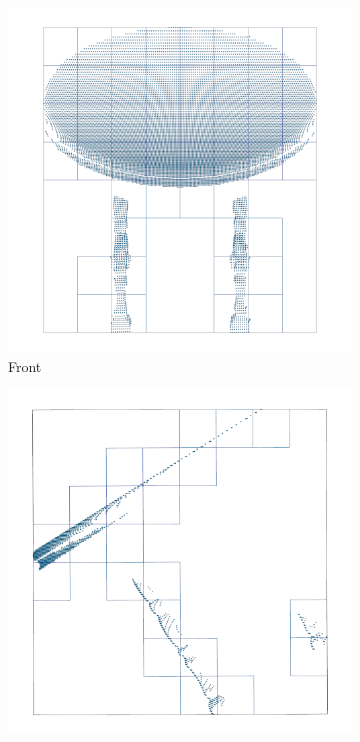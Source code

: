 \begin{figure}[!htb]
	\centering
	\hfill
	\begin{subfigure}{0.325\textwidth}
		\centering
		\includegraphics[width=\linewidth]{Figures/ObjRecog/surface_grid_front}
		\caption{Front}
		\label{subfig:objrecog:grid_occ:front}
	\end{subfigure}
	\hfill
	\begin{subfigure}{0.325\textwidth}
		\centering
		\includegraphics[width=\linewidth]{Figures/ObjRecog/surface_grid_side}

\end{subfigure}
\end{figure}
